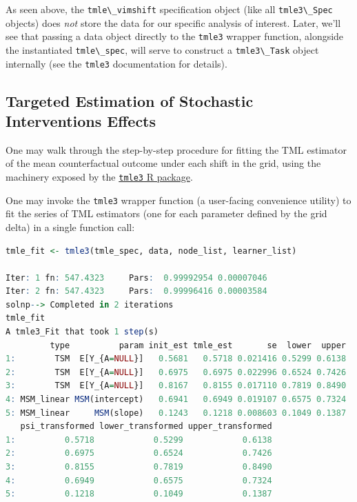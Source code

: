 \documentclass[
  12pt, krantz2,
]{krantz}
\newcommand{\passthrough}[1]{#1}
\newcommand{\1}{\mathbbm{1}}
\theoremstyle{definition}
\theoremstyle{definition}
\theoremstyle{definition}
\theoremstyle{definition}
\theoremstyle{remark}
\begin{document}
As seen above, the \passthrough{\lstinline!tmle\_vimshift!} specification object (like all \passthrough{\lstinline!tmle3\_Spec!}
objects) does \emph{not} store the data for our specific analysis of interest. Later,
we'll see that passing a data object directly to the \passthrough{\lstinline!tmle3!} wrapper function,
alongside the instantiated \passthrough{\lstinline!tmle\_spec!}, will serve to construct a \passthrough{\lstinline!tmle3\_Task!}
object internally (see the \passthrough{\lstinline!tmle3!} documentation for details).

\hypertarget{targeted-estimation-of-stochastic-interventions-effects-1}{%
\subsection{Targeted Estimation of Stochastic Interventions Effects}\label{targeted-estimation-of-stochastic-interventions-effects-1}}

One may walk through the step-by-step procedure for fitting the TML estimator
of the mean counterfactual outcome under each shift in the grid, using the
machinery exposed by the \href{https://tmle3.tlverse.org/}{\passthrough{\lstinline!tmle3!} R package}.

One may invoke the \passthrough{\lstinline!tmle3!} wrapper function (a user-facing convenience utility)
to fit the series of TML estimators (one for each parameter defined by the grid
delta) in a single function call:

\begin{lstlisting}[language=R]
tmle_fit <- tmle3(tmle_spec, data, node_list, learner_list)

Iter: 1 fn: 547.4323     Pars:  0.99992954 0.00007046
Iter: 2 fn: 547.4323     Pars:  0.99996416 0.00003584
solnp--> Completed in 2 iterations
tmle_fit
A tmle3_Fit that took 1 step(s)
         type          param init_est tmle_est       se  lower  upper
1:        TSM  E[Y_{A=NULL}]   0.5681   0.5718 0.021416 0.5299 0.6138
2:        TSM  E[Y_{A=NULL}]   0.6975   0.6975 0.022996 0.6524 0.7426
3:        TSM  E[Y_{A=NULL}]   0.8167   0.8155 0.017110 0.7819 0.8490
4: MSM_linear MSM(intercept)   0.6941   0.6949 0.019107 0.6575 0.7324
5: MSM_linear     MSM(slope)   0.1243   0.1218 0.008603 0.1049 0.1387
   psi_transformed lower_transformed upper_transformed
1:          0.5718            0.5299            0.6138
2:          0.6975            0.6524            0.7426
3:          0.8155            0.7819            0.8490
4:          0.6949            0.6575            0.7324
5:          0.1218            0.1049            0.1387
\end{lstlisting}
\end{document}
